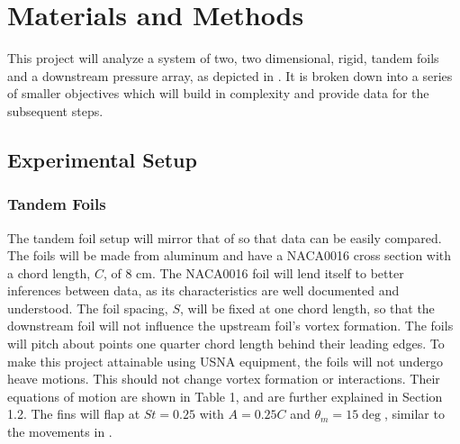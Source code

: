 \section{Materials and Methods}

    This project will analyze a system of two, two dimensional, rigid, tandem foils and a downstream pressure array, as depicted in . It is broken down into a series of smaller objectives which will build in complexity and provide data for the subsequent steps.

\subsection{Experimental Setup}
\subsubsection{Tandem Foils}
     The tandem foil setup will mirror that of \citep{Boschitsch2014} so that data can be easily compared. The foils will be made from aluminum and have a NACA0016 cross section with a chord length, \(C\), of 8 cm. The NACA0016 foil will lend itself to better inferences between data, as its characteristics are well documented and understood. The foil spacing, \(S\), will be fixed at one chord length, so that the downstream foil will not influence the upstream foil's vortex formation. The foils will pitch about points one quarter chord length behind their leading edges. To make this project attainable using USNA equipment, the foils will not undergo heave motions. This should not change vortex formation or interactions. Their equations of motion are shown in Table 1, and are further explained in Section 1.2. The fins will flap at \(St=0.25\) with \(A=0.25C\) and \(\theta_m=15\deg\), similar to the movements in \citep{Boschitsch2014}.

